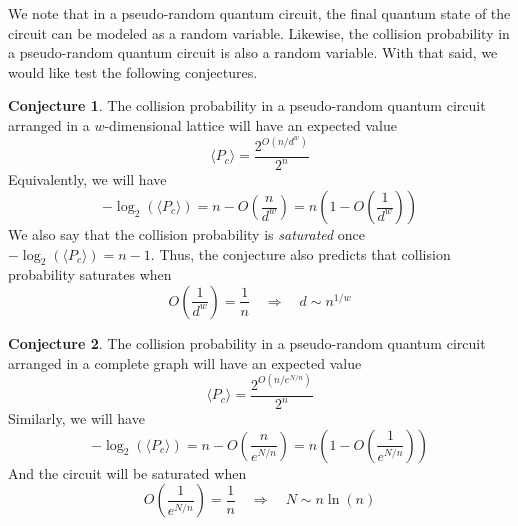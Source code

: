 \documentclass[11pt]{article}
\theoremstyle{definition}
\newtheorem{conjecture}{Conjecture}
\theoremstyle{plain}
\begin{document}
We note that in a pseudo-random quantum circuit, the final quantum state of the circuit can be modeled as a random variable. Likewise, the collision probability in a pseudo-random quantum circuit is also a random variable. With that said, we would like test the following conjectures. \\
\begin{conjecture}\label{conjecture_1}
  The collision probability in a pseudo-random quantum circuit arranged in a $w$-dimensional lattice will have an expected value 
  \begin{equation}
    \langle P_c \rangle= \frac{2^{O(n/d^w)}}{2^n}
  \end{equation}
  Equivalently, we will have
  \begin{equation}
    - \log_2( \langle P_c \rangle ) = n - O\left( \frac{n}{d^w} \right)
    = n \left(1 - O\left( \frac{1}{d^w} \right) \right)
  \end{equation}
We also say that the collision probability is \emph{saturated} once $-\log_2( \langle P_c \rangle) = n - 1$. Thus, the conjecture also predicts that collision probability saturates when
\begin{equation}
  O\left(\frac{1}{d^w} \right) = \frac{1}{n} \quad \Rightarrow \quad
  d \sim n^{1/w} 
\end{equation}
\end{conjecture}

\begin{conjecture}\label{conjecture_2}
  The collision probability in a pseudo-random quantum circuit arranged in a complete graph will have an expected value 
  \begin{equation}
    \langle P_c \rangle = \frac{2^{O(n/e^{N/n})}}{2^n}
  \end{equation}
  Similarly, we will have 
  \begin{equation}
    - \log_2( \langle P_c \rangle ) = n - O\left(\frac{n}{e^{N/n}}\right)
    = n \left( 1 - O\left(\frac{1}{e^{N/n}}\right) \right)
  \end{equation}
  And the circuit will be saturated when 
  \begin{equation}
    O\left(\frac{1}{e^{N/n}}\right) = \frac{1}{n} \quad \Rightarrow \quad 
    N \sim n \ln(n)
  \end{equation}
\end{conjecture}
\end{document}
